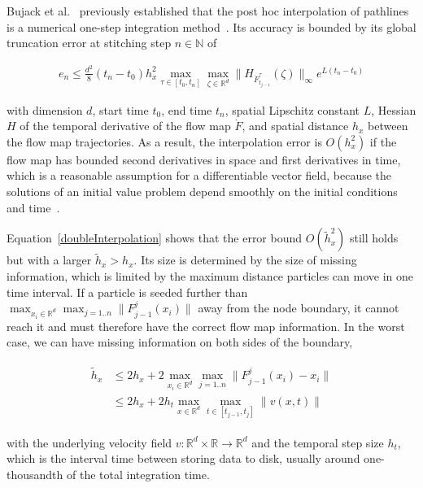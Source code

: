 %
Bujack et al.~\cite{bujack2015lagrangian} previously established that the post hoc interpolation 
of pathlines is a numerical one-step integration method~\cite{GH10}. 
%
Its accuracy is bounded by its global truncation error at stitching step $n\in\mathbb N$ of 
%
\begin{footnotesize}
\begin{equation}
\begin{aligned}\label{global}
e_{n}\leq\frac {d^2}8(t_n-t_0) h_x^2\max_{\tau\in[t_0,t_n]}\max_{\zeta\in\mathbb R^d}
\| H_{{\dot F}_{t_{j-1}}^{\tau}}(\zeta)\|_{\infty}e^{L(t_n-t_0)}
\end{aligned}
\end{equation}
\end{footnotesize}
%
with dimension $d$, start time $t_0$, end time $t_n$, spatial Lipschitz constant $L$, Hessian $H$ of the temporal derivative of the flow map $\dot F$, and spatial distance $h_x$ between the flow map trajectories.
%
%
As a result, the interpolation error is $O(h_x^2)$ if the flow map has bounded second derivatives in space and first derivatives in time, which is a reasonable assumption for a differentiable vector field, because the solutions of an initial value problem depend smoothly on the initial conditions and time~\cite{hartman1973ordinary}.
%

Equation~\eqref{doubleInterpolation} shows that the error bound $O(\tilde h_x^2)$ still holds but with a larger $\tilde h_x>h_x$. 
%
Its size is determined by the size of missing information, which is limited by the maximum distance particles can move in one time interval.
%
If a particle is seeded further than $\max_{x_i\in\mathbb R^d} \max_{j=1..n} \| F_{j-1}^j(x_i)\|$ away from the node boundary, it cannot reach it and must therefore have the correct flow map information.
%
In the worst case, we can have missing information on both sides of the boundary, 
%
\begin{footnotesize}
\begin{eqnarray}
\begin{aligned}\label{hx}
\tilde h_x&\leq 2h_x+2\max_{x_i\in\mathbb R^d} \max_{j=1..n} \| F_{j-1}^j(x_i) - x_i\|\\
&\leq 2h_x+2 h_t \max_{x\in\mathbb R^d} \max_{t\in[t_{j-1},t_j]}\| v(x,t)\|
\end{aligned}
\end{eqnarray}
\end{footnotesize}
%
with the underlying velocity field $v:\mathbb R^d \times \mathbb R \to \mathbb R^d$ and the temporal step size $h_t$, which is the interval time between storing data to disk, usually around one-thousandth of the total integration time.
%
%

